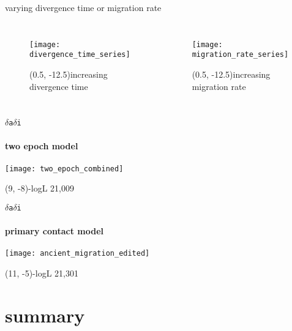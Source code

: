 \documentclass[xcolor=pdftex,dvipsnames,table, handout]{beamer}
\begin{document}
%
\begin{frame}{varying divergence time or migration rate}
\begin{columns}
\centering\scriptsize
\begin{figure}
\texttt{[image: divergence\_time\_series]}
\begin{textblock}{6}(0.5, -12.5)\centering\tiny increasing divergence time\vskip-5pt\end{textblock}
\end{figure}
\centering\scriptsize
\begin{figure}
\texttt{[image: migration\_rate\_series]}
\begin{textblock}{6}(0.5, -12.5)\centering\tiny increasing migration rate\vskip-5pt\end{textblock}
\end{figure}
\end{columns}
\end{frame}
%
\begin{frame}{\texttt{$\delta$a$\delta$i}}
\framesubtitle{two epoch model}
\centering
\texttt{[image: two\_epoch\_combined]}
\begin{textblock}{6}(9, -8)\scriptsize -logL 21,009\end{textblock}
\end{frame}
%
\begin{frame}{\texttt{$\delta$a$\delta$i}}
\framesubtitle{primary contact model}
\texttt{[image: ancient\_migration\_edited]}
\begin{textblock}{6}(11, -5)\scriptsize  -logL 21,301\end{textblock}
\end{frame}
%

\section{summary}
\end{document}
